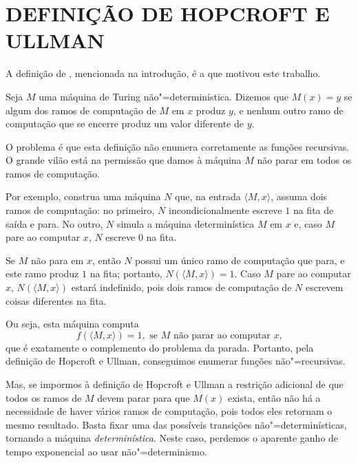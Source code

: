 \section{DEFINIÇÃO DE HOPCROFT E ULLMAN}

A definição de ,
mencionada na introdução,
é a que motivou este trabalho.
\begin{definition}
    Seja $M$ uma máquina de Turing não"=determinística.
    Dizemos que $M(x) = y$ se
    algum dos ramos de computação de $M$ em $x$ produz $y$,
    e nenhum outro ramo de computação que se encerre
    produz um valor diferente de $y$.
    \cite[p.~313]{HopcroftUllman1979}
\end{definition}

O problema é que esta definição não enumera corretamente as funções recursivas.
O grande vilão está na permissão que damos à máquina $M$
não parar em todos os ramos de computação.

Por exemplo,
construa uma máquina $N$ que,
na entrada $\langle M, x \rangle$,
assuma dois ramos de computação:
no primeiro,
$N$ incondicionalmente escreve $1$ na fita de saída e para.
No outro, $N$ simula a máquina determinística $M$ em $x$ e,
caso $M$ pare ao computar $x$,
$N$ escreve $0$ na fita.

Se $M$ não para em $x$,
então $N$ possui um único ramo de computação que para,
e este ramo produz $1$ na fita;
portanto, $N(\langle M, x \rangle) = 1$.
Caso $M$ pare ao computar $x$,
$N(\langle M, x \rangle)$ estará indefinido,
pois dois ramos de computação de $N$ escrevem coisas diferentes na fita.

Ou seja,
esta máquina computa
\begin{equation*}
    f(\langle M, x \rangle) = 1, \text{ se $M$ não parar ao computar $x$,}
\end{equation*}
que é exatamente o complemento do problema da parada.
Portanto,
pela definição de Hopcroft e Ullman,
conseguimos enumerar funções não"=recursivas.

Mas,
se impormos à definição de Hopcroft e Ullman a restrição adicional
de que todos os ramos de $M$ devem parar para que $M(x)$ exista,
então não há a necessidade de haver vários ramos de computação,
pois todos eles retornam o mesmo resultado.
Basta fixar uma das possíveis transições não"=determinísticas,
tornando a máquina \emph{determinística}.
Neste caso,
perdemos o aparente ganho de tempo exponencial ao usar não"=determinismo.
